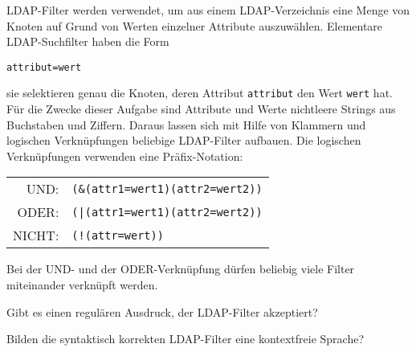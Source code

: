 LDAP-Filter werden verwendet, um aus einem LDAP-Verzeichnis eine Menge
von Knoten auf Grund von Werten einzelner Attribute auszuwählen.
Elementare LDAP-Suchfilter haben die Form
\begin{verbatim}
attribut=wert
\end{verbatim}
sie selektieren genau die Knoten, deren Attribut {\tt attribut}
den Wert {\tt wert} hat.
Für die Zwecke dieser Aufgabe sind Attribute und Werte nichtleere
Strings aus Buchstaben und Ziffern. 
Daraus lassen sich
mit Hilfe von Klammern und logischen Verknüpfungen
beliebige LDAP-Filter aufbauen.
Die logischen Verknüpfungen verwenden eine Präfix-Notation: 
\begin{center}
\begin{tabular}{rl}
UND:&\tt (\&(attr1=wert1)(attr2=wert2))\\
ODER:&\tt (|(attr1=wert1)(attr2=wert2))\\
NICHT:&\tt (!(attr=wert))
\end{tabular}
\end{center}
Bei der UND- und der ODER-Verknüpfung dürfen beliebig viele 
Filter miteinander verknüpft werden.
\begin{teilaufgaben}
\item
Gibt es einen regulären Ausdruck, der LDAP-Filter akzeptiert?
\item
Bilden die syntaktisch korrekten LDAP-Filter eine kontextfreie Sprache?
\end{teilaufgaben}

